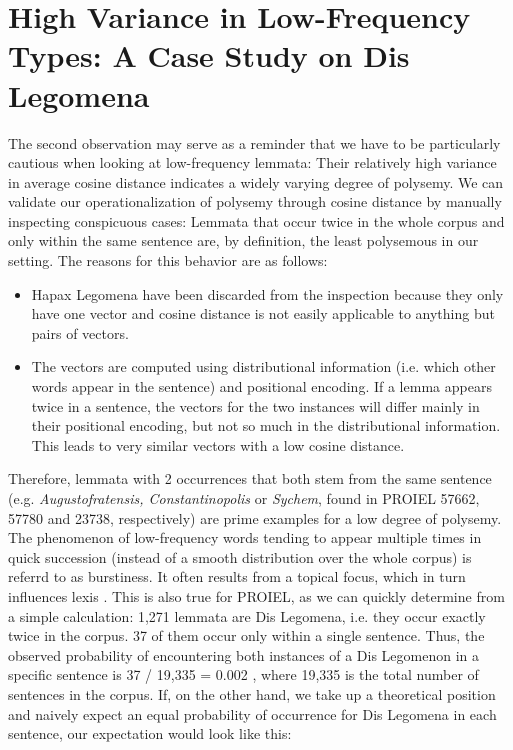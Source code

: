\documentclass[oneside]{book}
\begin{document}
\section{High Variance in Low-Frequency Types: A Case Study on Dis Legomena}
The second observation may serve as a reminder that we have to be particularly cautious when looking at low-frequency lemmata: Their relatively high variance in average cosine distance indicates a widely varying degree of polysemy. We can validate our operationalization of polysemy through cosine distance by manually inspecting conspicuous cases: Lemmata that occur twice in the whole corpus and only within the same sentence are, by definition, the least polysemous in our setting. The reasons for this behavior are as follows:
\begin{itemize}
	\item Hapax Legomena have been discarded from the inspection because they only have one vector and cosine distance is not easily applicable to anything but pairs of vectors.
	\item The vectors are computed using distributional information (i.e. which other words appear in the sentence) and positional encoding. If a lemma appears twice in a sentence, the vectors for the two instances will differ mainly in their positional encoding, but not so much in the distributional information. This leads to very similar vectors with a low cosine distance.
\end{itemize}
Therefore, lemmata with 2 occurrences that both stem from the same sentence (e.g. \textit{Augustofratensis, Constantinopolis} or \textit{Sychem}, found in PROIEL 57662, 57780 and 23738, respectively) are prime examples for a low degree of polysemy. The phenomenon of low-frequency words tending to appear multiple times in quick succession (instead of a smooth distribution over the whole corpus) is referrd to as burstiness. It often results from a topical focus, which in turn influences lexis \parencite[99]{pierrehumbertBurstinessVerbsDerived2012}. This is also true for PROIEL, as we can quickly determine from a simple calculation: 1,271 lemmata are Dis Legomena, i.e. they occur exactly twice in the corpus. 37 of them occur only within a single sentence. Thus, the observed probability of encountering both instances of a Dis Legomenon in a specific sentence is 37 / 19,335 = 0.002 , where 19,335 is the total number of sentences in the corpus. If, on the other hand, we take up a theoretical position and naively expect an equal probability of occurrence for Dis Legomena in each sentence, our expectation would look like this:
\end{document}
